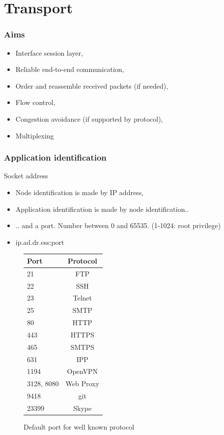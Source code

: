 \section{Transport}
  \begin{frame}
    \frametitle{Aims}
      \begin{itemize}
        \item Interface session layer,
        \item Reliable end-to-end communication,
        \item Order and reassemble received packets (if needed),
        \item Flow control,
        \item Congestion avoidance (if supported by protocol),
        \item Multiplexing
      \end{itemize}
  \end{frame}

  \begin{frame}
    \frametitle{Application identification}
    \begin{block}{Socket address}
      \begin{itemize}
        \item Node identification is made by IP address,
        \item Application identification is made by node identification..
        \item .. and a port. Number between 0 and 65535. (1-1024: root privilege)
        \item \begin{center} ip.ad.dr.ess:port \end{center}
      \end{itemize}
    \end{block}
  \end{frame}

  \begin{frame}
    \begin{figure}
      \centering
      \begin{tabular}{l|c}
        Port  & Protocol \\ \hline
        21    & FTP \\ \hline
        22    & SSH \\ \hline
        23    & Telnet \\ \hline
        25    & SMTP \\ \hline
        80    & HTTP \\ \hline
        443   & HTTPS \\ \hline
        465   & SMTPS \\ \hline
        631   & IPP \\ \hline
        1194  & OpenVPN \\ \hline
        3128, 8080 & Web Proxy \\ \hline
        9418  & git \\ \hline
        23399 & Skype \\ \hline
      \end{tabular}
      \caption{Default port for well known protocol}
      \label{fig:def-port}
    \end{figure}
  \end{frame}

